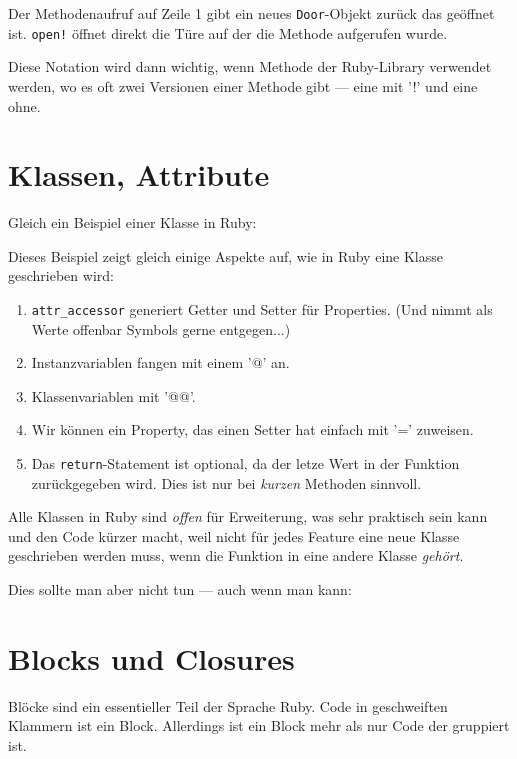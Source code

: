 \documentclass[a4book,11pt,twoside]{scrbook}
\begin{document}


Der Methodenaufruf auf Zeile 1 gibt ein neues \texttt{Door}-Objekt zurück das geöffnet ist. \texttt{open!} öffnet direkt die Türe auf der die Methode aufgerufen wurde.

Diese Notation wird dann wichtig, wenn Methode der Ruby-Library verwendet werden, wo es oft zwei Versionen einer Methode gibt — eine mit '!' und eine ohne.







\section{Klassen, Attribute} %
\label{sec:klassen_methoden_attribute}
Gleich ein Beispiel einer Klasse in Ruby:



Dieses Beispiel zeigt gleich einige Aspekte auf, wie in Ruby eine Klasse geschrieben wird:

\begin{enumerate}
	\item \texttt{attr\_accessor} generiert Getter und Setter für Properties. (Und nimmt als Werte offenbar Symbols gerne entgegen...)
	\item Instanzvariablen fangen mit einem '@' an.
	\item Klassenvariablen mit '@@'.
	\item Wir können ein Property, das einen Setter hat einfach mit '=' zuweisen.
	\item Das \texttt{return}-Statement ist optional, da der letze Wert in der Funktion zurückgegeben wird. Dies ist nur bei \emph{kurzen} Methoden sinnvoll.
\end{enumerate}

Alle Klassen in Ruby sind \emph{offen} für Erweiterung, was sehr praktisch sein kann und den Code kürzer macht, weil nicht für jedes Feature eine neue Klasse geschrieben werden muss, wenn die Funktion in eine andere Klasse \emph{gehört}.



Dies sollte man aber nicht tun — auch wenn man kann:




\section{Blocks und Closures} %
\label{sec:blocks_und_closures}
Blöcke sind ein essentieller Teil der Sprache Ruby. Code in geschweiften Klammern ist ein Block. Allerdings ist ein Block mehr als nur Code der gruppiert ist.
\end{document}
